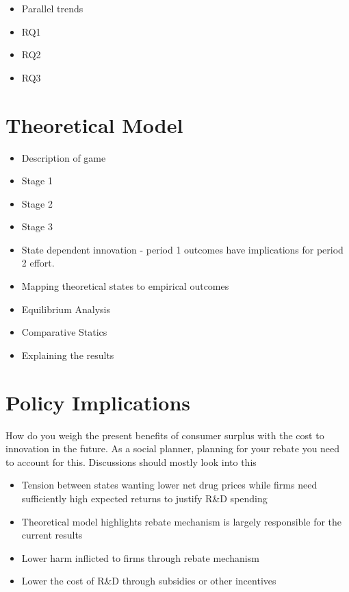 \documentclass[12pt]{article}
\begin{document}
\begin{itemize}
    \item Parallel trends
    \item RQ1
    \item RQ2
    \item RQ3 
\end{itemize}

\section{Theoretical Model}

\begin{itemize}
    \item Description of game
    \item Stage 1
    \item Stage 2
    \item Stage 3
    \item State dependent innovation - period 1 outcomes have implications for period 2 effort.
    \item Mapping theoretical states to empirical outcomes
    \item Equilibrium Analysis
    \item Comparative Statics
    \item Explaining the results
\end{itemize}

\section{Policy Implications}

How do you weigh the present benefits of consumer surplus with the cost to innovation in the future. As a social planner, planning for your rebate you need to account for this. Discussions should mostly look into this

\begin{itemize}
    \item Tension between states wanting lower net drug prices while firms need sufficiently high expected returns to justify R\&D spending
    \item Theoretical model highlights rebate mechanism is largely responsible for the current results
    \item Lower harm inflicted to firms through rebate mechanism
    \item Lower the cost of R\&D through subsidies or other incentives
\end{itemize}
\end{document}
